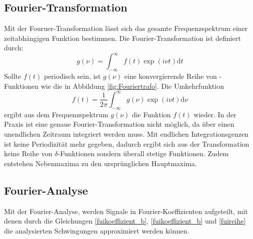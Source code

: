 \subsection{Fourier-Transformation}
\label{sec:Fourier-Transformation}
Mit der Fouruer-Transformation lässt sich das gesamte Frequenzspektrum einer
zeitabhängigen Funktion bestimmen. Die Fourier-Transformation ist definiert durch:
\begin{equation}
  g(\nu)= \int_{-\infty}^\infty f(t)\exp(i\nu t) \mathrm{d}t
\end{equation}
Sollte $f(t)$ periodisch sein, ist $g(\nu)$ eine konvergierende Reihe von
\delta-Funktionen wie die in Abbildung \ref{fig:Fouriertrafo}. Die Umkehrfunktion
\begin{equation}
  f(t)= \frac{1}{2\pi}\int_{-\infty}^\infty g(\nu)\exp(i\nu t) \mathrm{d}\nu
\end{equation}
ergibt aus dem Frequenzspektrum $g(\nu)$ die Funktion $f(t)$ wieder. In der
Praxis ist eine genaue Fourier-Transformation nicht möglich, da über einen unendlichen
Zeitraum integriert werden muss. Mit endlichen Integrationsgenzen ist keine
Periodizität mehr gegeben, dadurch ergibt sich aus der Transformation keine Reihe
von $\delta$-Funktionen sondern überall stetige Funktionen. Zudem entstehen
Nebenmaxima zu den ursprünglichen Hauptmaxima.
\subsection{Fourier-Analyse}
\label{sec:Fourier-Analyse}
Mit der Fourier-Analyse, werden Signale in Fourier-Koeffizienten aufgeteilt, mit
denen durch die Gleichungen \eqref{fuikoeffizient_b}, \eqref{fuikoeffizient_b}
und \eqref{fuireihe} die analysierten Schwingungen approximiert werden können.



\cite{sample}
